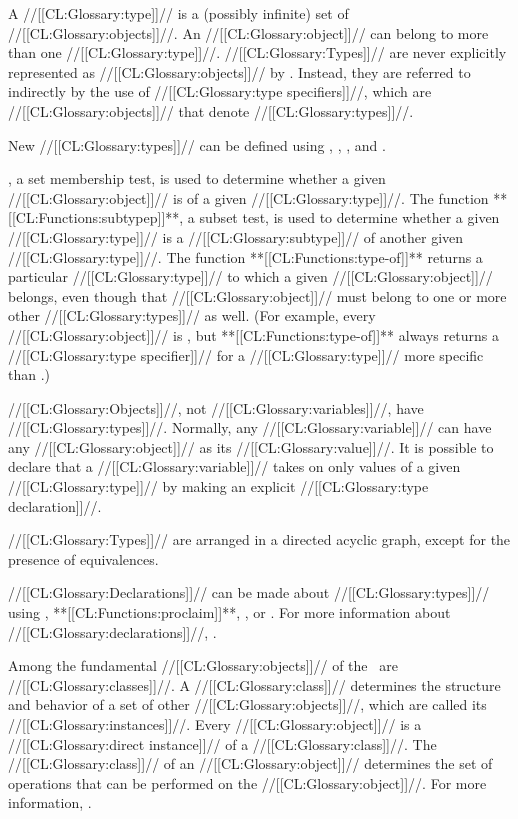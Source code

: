 




A //[[CL:Glossary:type]]// is a (possibly infinite) set of //[[CL:Glossary:objects]]//.
An //[[CL:Glossary:object]]// can belong to more than one //[[CL:Glossary:type]]//.  
//[[CL:Glossary:Types]]// are never explicitly represented as //[[CL:Glossary:objects]]// by \clisp.
Instead, they are referred to indirectly by the use of //[[CL:Glossary:type specifiers]]//,
which are //[[CL:Glossary:objects]]// that denote //[[CL:Glossary:types]]//.

New //[[CL:Glossary:types]]// can be defined using , , 
, and .

, a set membership test, is used to determine
whether a given //[[CL:Glossary:object]]// is of a given //[[CL:Glossary:type]]//.  The function
**[[CL:Functions:subtypep]]**, a subset test, is used to determine whether a
given //[[CL:Glossary:type]]// is a //[[CL:Glossary:subtype]]// of another given //[[CL:Glossary:type]]//.  The
function **[[CL:Functions:type-of]]** returns a particular //[[CL:Glossary:type]]// to
which a given //[[CL:Glossary:object]]// belongs, even though that //[[CL:Glossary:object]]//
must belong to one or more other //[[CL:Glossary:types]]// as well.
(For example, every //[[CL:Glossary:object]]// is , 
 but **[[CL:Functions:type-of]]** always returns a //[[CL:Glossary:type specifier]]//
 for a //[[CL:Glossary:type]]// more specific than .)


//[[CL:Glossary:Objects]]//, not //[[CL:Glossary:variables]]//, have //[[CL:Glossary:types]]//.
Normally, any //[[CL:Glossary:variable]]// can have any //[[CL:Glossary:object]]// as its //[[CL:Glossary:value]]//.
It is possible to declare that a //[[CL:Glossary:variable]]// takes on only 
values of a given //[[CL:Glossary:type]]// by making an explicit //[[CL:Glossary:type declaration]]//.

//[[CL:Glossary:Types]]// are arranged in a directed acyclic graph, except
for the presence of equivalences. 

//[[CL:Glossary:Declarations]]// can be made about //[[CL:Glossary:types]]// using , 
**[[CL:Functions:proclaim]]**, , or .
For more information about //[[CL:Glossary:declarations]]//,
\seesection\Declarations.

Among the fundamental //[[CL:Glossary:objects]]// of the \CLOS\ are //[[CL:Glossary:classes]]//.
A //[[CL:Glossary:class]]// determines the structure and behavior of a set of
other //[[CL:Glossary:objects]]//, which are called its //[[CL:Glossary:instances]]//. 
Every //[[CL:Glossary:object]]// is a //[[CL:Glossary:direct instance]]// of a //[[CL:Glossary:class]]//.
The //[[CL:Glossary:class]]// of an //[[CL:Glossary:object]]// determines the set of
operations that can be performed on the //[[CL:Glossary:object]]//.
For more information, \seesection\Classes.

